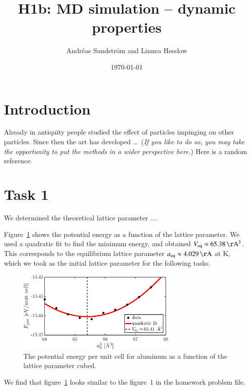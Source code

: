 
\usepackage{units}


\title{H1b: MD simulation -- dynamic properties}
\author{Andr\'eas Sundstr\"om and Linnea Hesslow}
\date{\today}





\section*{Introduction}

Already in antiquity people studied the effect of particles impinging on other
particles. Since then the art has developed \ldots\
(\emph{If you like to do so, you may take the opportunity to put the  methods
in a wider perspective here.}) Here is a random reference.\cite{lamport94}

\section*{Task 1}
We determined the theoretical lattice parameter ....

Figure~\ref{fig1} shows the potential energy as a function of the lattice parameter. We used a quadratic fit to find the minimum energy, and obtained $V_{\rm eq} \approx \unit[65.38]{\AA^3}$. This corresponds to the equilibrium lattice parameter $a_{\rm eq} \approx \unit[4.029]{\AA}$ at \unit[0]{K}, which we took as the initial lattice parameter for the following tasks.  

\begin{figure}[!ht]
\begin{center}
  \includegraphics[width=0.7\textwidth]{../figures/potential_energy} 
  \caption{The potential energy per unit cell for aluminum as a function of the lattice parameter cubed.}
  \label{fig1}
\end{center}
\end{figure}

We find that figure~\ref{fig1} looks similar to the figure~1 in the homework problem file. 

